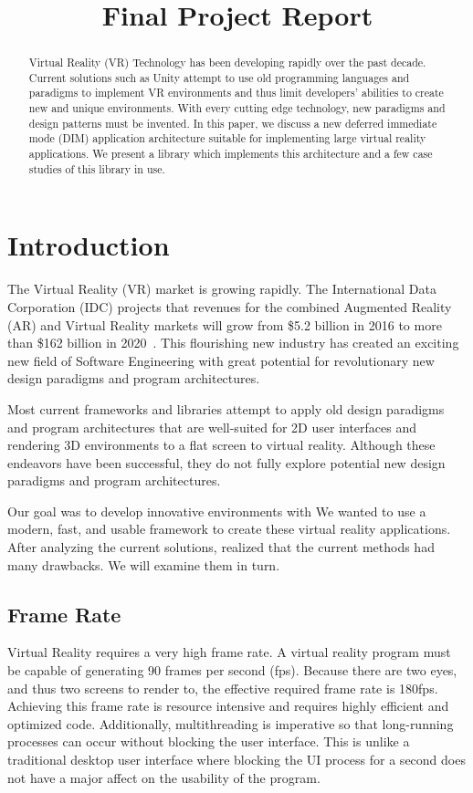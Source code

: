 \documentclass[conference,12pt]{IEEEtran}
\title{Final Project Report}
\author{%
    \IEEEauthorblockN{%
        Jonathan Sumner Evans\IEEEauthorrefmark{1},
        Robinson Merillat\IEEEauthorrefmark{2}, and
        Sam Sartor\IEEEauthorrefmark{3}
    }
    \IEEEauthorblockA{%
        Department of Computer Science,
        Colorado School of Mines\\
        Golden, Colorado\\
        Email:
            \IEEEauthorrefmark{1}jonathanevans@mines.edu,
            \IEEEauthorrefmark{2}rdmerillat@mines.edu,
            \IEEEauthorrefmark{3}ssartor@mines.edu
    }
}
\begin{document}
\maketitle

\begin{abstract}
    Virtual Reality (VR) Technology has been developing rapidly over the past
    decade. Current solutions such as Unity attempt to use old programming
    languages and paradigms to implement VR environments and thus limit
    developers' abilities to create new and unique environments. With every
    cutting edge technology, new paradigms and design patterns must be invented.
    In this paper, we discuss a new deferred immediate mode (DIM) application
    architecture suitable for implementing large virtual reality applications.
    We present a library which implements this architecture and a few case
    studies of this library in use.
\end{abstract}

\section{Introduction}
The Virtual Reality (VR) market is growing rapidly. The International Data
Corporation (IDC) projects that revenues for the combined Augmented Reality (AR)
and Virtual Reality markets will grow from \$5.2 billion in 2016 to more than
\$162 billion in 2020~\cite{IDC:2016:VR-industry}. This flourishing new industry
has created an exciting  new field of Software Engineering with great potential
for revolutionary new design paradigms and program architectures.

Most current frameworks and libraries attempt to apply old design paradigms and
program architectures that are well-suited for 2D user interfaces and rendering
3D environments to a flat screen to virtual reality. Although these endeavors
have been successful, they do not fully explore potential new design paradigms
and program architectures.

Our goal was to develop innovative environments with %
We wanted to use a modern, fast, and usable framework to create these virtual
reality applications. After analyzing the current solutions, realized that the
current methods had many drawbacks. We will examine them in turn.

\subsection{Frame Rate}
Virtual Reality requires a very high frame rate. A virtual reality program must
be capable of generating 90 frames per second (fps). Because there are two eyes,
and thus two screens to render to, the effective required frame rate is 180fps.
Achieving this frame rate is resource intensive and requires highly efficient
and optimized code. Additionally, multithreading is imperative so that
long-running processes can occur without blocking the user interface. This is
unlike a traditional desktop user interface where blocking the UI process for a
second does not have a major affect on the usability of the program.
\end{document}
